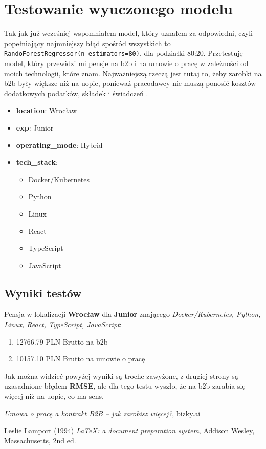 \documentclass[a4paper]{article}
\begin{document}
\section{Testowanie wyuczonego modelu}

\quad Tak jak już wcześniej wspomniałem model, który uznałem za odpowiedni, czyli popełniający najmniejszy błąd
spośród wszystkich to \texttt{RandoForestRegressor(n\_estimators=80)}, dla podziałki 80:20.
Przetestuję model, który przewidzi mi pensje na b2b i na umowie o pracę w zależności od
moich technologii, które znam. Najważniejszą rzeczą jest tutaj to, żeby zarobki na b2b były większe niż na uopie,
ponieważ pracodawcy nie muszą ponosić kosztów dodatkowych podatków, składek i świadczeń \cite{uop_vs_b2b}.

\begin{itemize}
    \item \textbf{location}: Wrocław
    \item \textbf{exp}: Junior
    \item \textbf{operating\_mode}: Hybrid
    \item \textbf{tech\_stack}:
          \begin{itemize}
              \item Docker/Kubernetes
              \item Python
              \item Linux
              \item React
              \item TypeScript
              \item JavaScript
          \end{itemize}
\end{itemize}

\subsection{Wyniki testów}

Pensja w lokalizacji \textbf{Wrocław} dla \textbf{Junior} znającego \textit{Docker/Kubernetes, Python, Linux, React, TypeScript, JavaScript}:

\begin{enumerate}
    \item 12766.79 PLN Brutto na b2b
    \item 10157.10 PLN Brutto na umowie o pracę
\end{enumerate}

\quad Jak można widzieć powyżej wyniki są troche zawyżone, z drugiej strony są uzasadnione błędem \textbf{RMSE}, ale dla tego testu wyszło, że na b2b
zarabia się więcej niż na uopie, co ma sens.

\begin{thebibliography}{9}
    \href{https://bizky.ai/blog/umowa-o-prace-a-kontrakt-b2b-co-sie-bardziej-oplaca/}{\textit{Umowa o pracę a kontrakt B2B – jak zarobisz więcej?}}, bizky.ai

    Leslie Lamport (1994) \emph{\LaTeX: a document preparation system}, Addison
    Wesley, Massachusetts, 2nd ed.
\end{thebibliography}
\end{document}
